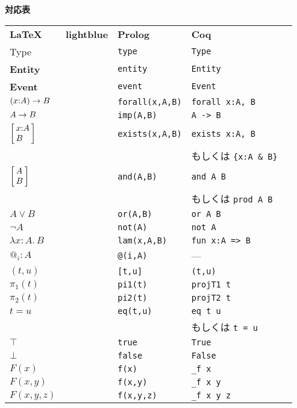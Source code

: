 \documentclass{article}
\newcommand{\dPi}[3][x]{\ensuremath{%
  \left( 
  #1{:}#2 
  \right) \to #3
  }}
\newcommand{\dSigma}[3][x]{\ensuremath{%
  \left[\kern-0.3em
  \begin{array}{l}
  #1{:}#2 \\
  #3
  \end{array}
  \kern-0.3em\right]
  }}
\newcommand{\dConj}[3][x]{\ensuremath{%
  \left[\kern-0.3em
  \begin{array}{l}
  #2 \\
  #3
  \end{array}
  \kern-0.3em\right]
  }}
\newcommand{\dImp}[3][x]{\ensuremath{%
  #2 \to #3
  }}
\begin{document}
\large

\begin{center}
{\Large\textbf{対応表}}
\end{center}

\bigskip

\begin{tabular}{lllll}
\medskip
\textbf{\LaTeX} & \textbf{lightblue} & \textbf{Prolog} & \textbf{Coq} \\
\medskip
Type & & \verb|type| & \verb|Type| \\
\medskip
\textbf{Entity} & & \verb|entity| & \verb|Entity| \\
\medskip
\textbf{Event} & & \verb|event| & \verb|Event| \\
\medskip
$\dPi[x]{A}{B}$ & & \verb|forall(x,A,B)|  & \verb|forall x:A, B| &\\
\medskip
$\dImp[x]{A}{B}$ & & \verb|imp(A,B)|  & \verb|A -> B| &\\
\medskip
$\dSigma[x]{A}{B}$ & & \verb|exists(x,A,B)| & \verb|exists x:A, B| &\\
\medskip
                               &  &                                & {\normalsize もしくは} \verb|{x:A & B}| \\
\medskip
$\dConj{A}{B}$ & & \verb|and(A,B)| & \verb|and A B| &\\
\medskip
                               &  &                                & {\normalsize もしくは} \verb|prod A B| \\
\medskip
$A \vee B$ & & \verb|or(A,B)| & \verb|or A B| &\\
\medskip
$\neg A$ & & \verb|not(A)| & \verb|not A| &\\
\medskip
$\lambda x : A.\, B$ & & \verb|lam(x,A,B)| & \verb|fun x:A => B| &\\
\medskip
$@_i : A$ & & \verb|@(i,A)| & --- &\\
\medskip
$(t, u)$ & & \verb|[t,u]| & \verb|(t,u)| &\\
\medskip
$\pi_1(t)$ & & \verb|pi1(t)| & \verb|projT1 t| &\\
\medskip
$\pi_2(t)$ & & \verb|pi2(t)| & \verb|projT2 t| &\\
\medskip
$t = u$ & & \verb|eq(t,u)| & \verb|eq t u| &\\
            &  &                      & {\normalsize もしくは} \verb|t = u| & \\
\medskip
$\top$ & & \verb|true| & \verb|True| & \\
\medskip
$\bot$ & & \verb|false| & \verb|False| & \\
$F(x)$ & & \verb|f(x)| & \verb|_f x| \\
$F(x,y)$ & & \verb|f(x,y)| & \verb|_f x y| \\
$F(x,y,z)$ & & \verb|f(x,y,z)| & \verb|_f x y z|
\end{tabular}
\end{document}
